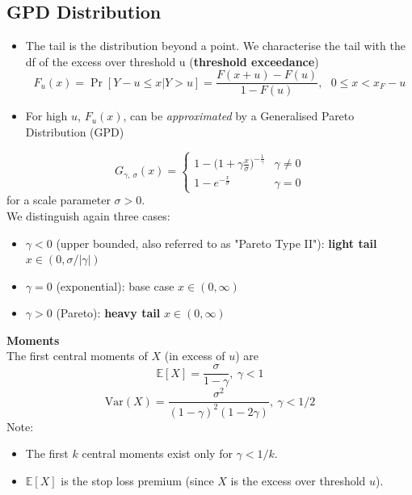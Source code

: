 \documentclass[11pt]{article}
\newcommand{\noi}{\noindent}
\begin{document}
\subsection{GPD Distribution}
\begin{itemize}
    \item The tail is the distribution beyond a point. We characterise the tail with the df of the excess over threshold u (\textbf{threshold exceedance})
        $$F_u(x) = \Pr[Y - u \leq x | Y > u] = \frac{F(x+u) - F(u)}{1 - F(u)}, \ \ \ 0 \leq x < x_{F} - u$$
    \item For high $u$, $F_u(x)$, can be \textit{approximated} by a Generalised Pareto Distribution (GPD)
\end{itemize} \phantom{i}

$$G_{\gamma, \ \sigma}(x) = \begin{cases}
    1 - \Big( 1 + \gamma \frac{x}{\sigma} \Big)^{-\frac{1}{\gamma}} & \gamma \neq 0 \\
    1 - e^{-\frac{x}{\sigma}} & \gamma = 0
\end{cases}$$
\noi for a scale parameter $\sigma > 0$. \\

\noi We distinguish again three cases:
\begin{itemize}
    \item $\gamma < 0$ (upper bounded, also referred to as "Pareto Type II"): \textbf{light tail} $x \in (0, \sigma/|\gamma|)$
    \item $\gamma = 0$ (exponential): base case $x \in (0, \infty)$
    \item $\gamma > 0$ (Pareto): \textbf{heavy tail} $x \in (0, \infty)$
\end{itemize} \phantom{i}

\noi \textbf{Moments} \\
\noi The first central moments of $X$ (in excess of $u$) are
$$\mathbb{E}[X] = \frac{\sigma}{1-\gamma}, \: \gamma < 1$$
$$\text{Var}(X) = \frac{\sigma^2}{(1-\gamma)^2(1-2\gamma)}, \: \gamma < 1/2$$
\noi Note:
\begin{itemize}
    \item The first $k$ central moments exist only for $\gamma < 1/k$.
    \item $\mathbb{E}[X]$ is the stop loss premium (since $X$ is the excess over threshold $u$).
\end{itemize}
\end{document}
